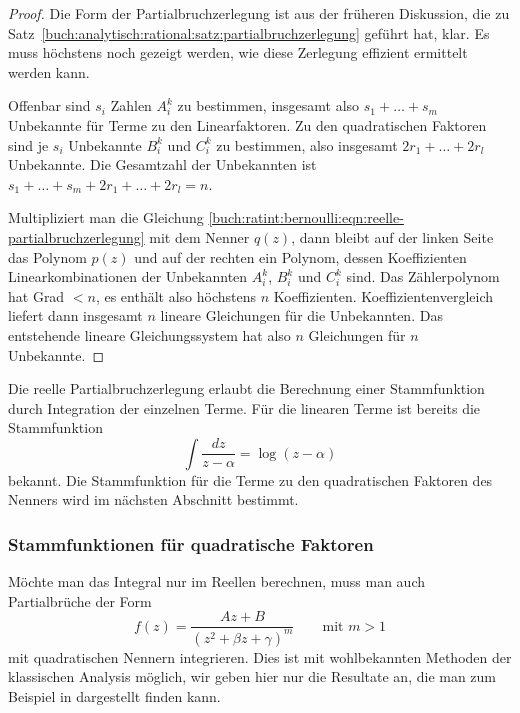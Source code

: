 \begin{proof}
Die Form der Partialbruchzerlegung ist aus der früheren Diskussion,
die zu Satz~\ref{buch:analytisch:rational:satz:partialbruchzerlegung}
geführt hat, klar.
Es muss höchstens noch gezeigt werden, wie diese Zerlegung effizient
ermittelt werden kann.

Offenbar sind $s_i$ Zahlen $A_i^k$ zu bestimmen, insgesamt also
$s_1+\dots+s_m$ Unbekannte für Terme zu den Linearfaktoren.
Zu den quadratischen Faktoren sind je $s_i$ Unbekannte
%
$B_i^k$ und $C_i^k$ zu bestimmen, also insgesamt
$2r_1+\dots+2r_l$ Unbekannte.
Die Gesamtzahl der Unbekannten ist $s_1+\dots+s_m+2r_1+\dots+2r_l=n$.


Multipliziert man die Gleichung
\eqref{buch:ratint:bernoulli:eqn:reelle-partialbruchzerlegung}
mit dem Nenner $q(z)$, dann bleibt auf der linken Seite das Polynom
$p(z)$ und auf der rechten ein Polynom, dessen Koeffizienten
Linearkombinationen der Unbekannten $A_i^k$, $B_i^k$ und $C_i^k$
sind.
Das Zählerpolynom hat Grad $<n$, es enthält also höchstens $n$
Koeffizienten.
Koeffizientenvergleich liefert dann insgesamt $n$ lineare Gleichungen
für die Unbekannten.
Das entstehende lineare Gleichungssystem hat also $n$ Gleichungen für
%
$n$ Unbekannte.
\end{proof}

Die reelle Partialbruchzerlegung erlaubt die Berechnung einer
Stammfunktion durch Integration der einzelnen Terme.
Für die linearen Terme ist bereits die Stammfunktion
\[
\int\frac{dz}{z-\alpha}
=
\log (z-\alpha)
\]
bekannt.
Die Stammfunktion für die Terme zu den quadratischen Faktoren
des Nenners wird im nächsten Abschnitt bestimmt.

%
%
\subsubsection{Stammfunktionen für quadratische Faktoren}
Möchte man das Integral nur im Reellen berechnen, muss man auch 
Partialbrüche der Form
\begin{equation}
f(z)
=
\frac{Az+B}{(z^2 +\beta z + \gamma)^m}
\qquad\text{mit $m>1$}
\label{buch:ratint:bernoulli:eqn:quadrpotnenner}
\end{equation}
mit quadratischen Nennern integrieren.
Dies ist mit wohlbekannten Methoden der klassischen Analysis 
möglich, wir geben hier nur die Resultate an, die man zum Beispiel
in \cite[section 2.1]{buch:bronstein} dargestellt finden kann.


